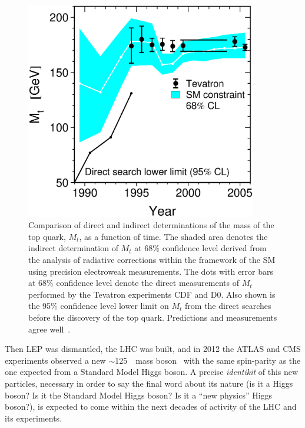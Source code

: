 \begin{figure}[hbtp]
\begin{center}
\includegraphics[width=0.9\textwidth]{theory/figures/history_mt}
\caption{Comparison of direct
and indirect determinations of the mass of the top quark, $M_t$, as a
function of time.  The shaded area denotes the indirect determination
of $M_t$ at 68\% confidence level derived from the analysis of
radiative corrections within the framework of the SM using
precision electroweak measurements. The dots with error bars at 68\%
confidence level denote the direct measurements of $M_t$ performed by
the Tevatron experiments CDF and D0.  Also shown is the 95\%
confidence level lower limit on $M_t$ from the direct searches before
the discovery of the top quark. Predictions and measurements agree
well~\cite{ALEPH:2005ab}.}
\label{fig:history_mt}
\end{center}
\end{figure}




Then LEP was dismantled, the LHC was built, and in 2012 
the ATLAS and CMS experiments
observed a new $\sim$125~\gev\ mass boson~\cite{2012gk,Chatrchyan201230}
with the same spin-parity as the one expected from a Standard Model
Higgs boson. A precise {\it identikit} of this new particles, necessary
in order to say the final word about its nature (is it a Higgs boson?
Is it the Standard Model Higgs boson? Is it a ``new physics'' Higgs boson?),
is expected to come within the next decades of activity of the LHC and its
experiments.

